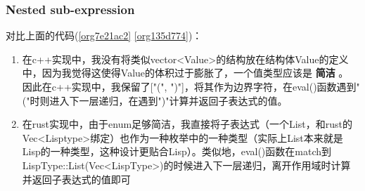 \documentclass[11pt]{article}
\begin{document}
\subsubsection{Nested sub-expression}
\label{sec:org3ba4d9f}
对比上面的代码(\ref{org7e21ac2} \ref{org135d774})：
\begin{enumerate}
\item 在c++实现中，我没有将类似vector<Value>的结构放在结构体Value的定义中，因为我觉得这使得Value的体积过于膨胀了，一个值类型应该是 \textbf{\textbf{简洁}} 。
因此在c++实现中，我保留了["(", ")"]，将其作为边界字符，在eval()函数遇到"("时则进入下一层递归，在遇到")"计算并返回子表达式的值。
\item 在rust实现中，由于enum足够简洁，我直接将子表达式（一个List，和rust的Vec<Lisptype>绑定）也作为一种枚举中的一种类型（实际上List本来就是Lisp的一种类型，这种设计更贴合Lisp）。类似地，eval()函数在match到LispType::List(Vec<LispType>)的时候进入下一层递归，离开作用域时计算并返回子表达式的值即可
\end{enumerate}
\end{document}
